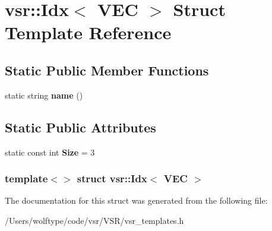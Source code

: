 \hypertarget{structvsr_1_1_idx_3_01_v_e_c_01_4}{\section{vsr\-:\-:Idx$<$ V\-E\-C $>$ Struct Template Reference}
\label{structvsr_1_1_idx_3_01_v_e_c_01_4}
}
\subsection*{Static Public Member Functions}
\begin{DoxyCompactItemize}
\item 
\hypertarget{structvsr_1_1_idx_3_01_v_e_c_01_4_a6bbf7ed6b30bebe9e402fc38fdb5f407}{static string {\bfseries name} ()}\label{structvsr_1_1_idx_3_01_v_e_c_01_4_a6bbf7ed6b30bebe9e402fc38fdb5f407}

\end{DoxyCompactItemize}
\subsection*{Static Public Attributes}
\begin{DoxyCompactItemize}
\item 
\hypertarget{structvsr_1_1_idx_3_01_v_e_c_01_4_aaf9377ab49cde57f1fc422791b9221ab}{static const int {\bfseries Size} = 3}\label{structvsr_1_1_idx_3_01_v_e_c_01_4_aaf9377ab49cde57f1fc422791b9221ab}

\end{DoxyCompactItemize}
\subsubsection*{template$<$$>$ struct vsr\-::\-Idx$<$ V\-E\-C $>$}



The documentation for this struct was generated from the following file\-:\begin{DoxyCompactItemize}
\item 
/\-Users/wolftype/code/vsr/\-V\-S\-R/vsr\-\_\-templates.\-h\end{DoxyCompactItemize}
